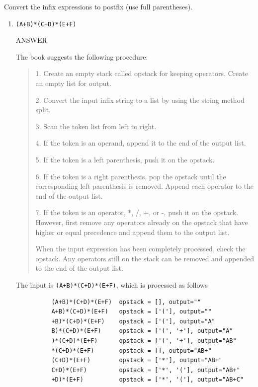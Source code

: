 \documentclass{article} %
\newenvironment{mpage}
  {\hspace{0.1in}
   \begin{minipage}{4.5in}
     \setlength{\parskip}{.5em}
     \vspace{0.1in}}    
  {\vspace{0.1in}
   \end{minipage}}
\begin{document}
\begin{enumerate}
  Convert the infix expressions to postfix (use full parentheses).

  \begin{enumerate}
  \item \label{infix2post}
    \verb|(A+B)*(C+D)*(E+F)|

    \begin{mpage}
      ANSWER

      The book suggests the following procedure:

      \begin{quotation}
        
        1. Create an empty stack called opstack for keeping
        operators. Create an empty list for output.

        2. Convert the input infix string to a list by using the string
        method split.

        3. Scan the token list from left to right.

        4. If the token is an operand, append it to the end of the output list.

        5. If the token is a left parenthesis, push it on the opstack.

        6. If the token is a right parenthesis, pop the opstack until the
        corresponding left parenthesis is removed. Append each
        operator to the end of the output list.

        7. If the token is an operator, *, /, +, or -, push it on the
        opstack. However, first remove any operators already on the
        opstack that have higher or equal precedence and append them
        to the output list.

        When the input expression has been completely processed, check
        the opstack. Any operators still on the stack can be removed
        and appended to the end of the output list.
      \end{quotation}
    \end{mpage}

    \begin{mpage}
      The input is \verb|(A+B)*(C+D)*(E+F)|, which is processed as follows

        \begin{verbatim}
          (A+B)*(C+D)*(E+F)  opstack = [], output=""
          A+B)*(C+D)*(E+F)   opstack = ['('], output=""
          +B)*(C+D)*(E+F)    opstack = ['('], output="A"
          B)*(C+D)*(E+F)     opstack = ['(', '+'], output="A"
          )*(C+D)*(E+F)      opstack = ['(', '+'], output="AB"
          *(C+D)*(E+F)       opstack = [], output="AB+"
          (C+D)*(E+F)        opstack = ['*'], output="AB+"
          C+D)*(E+F)         opstack = ['*', '('], output="AB+"
          +D)*(E+F)          opstack = ['*', '('], output="AB+C"
          

\end{verbatim}
\end{mpage}
\end{enumerate}
\end{enumerate}
\end{document}
